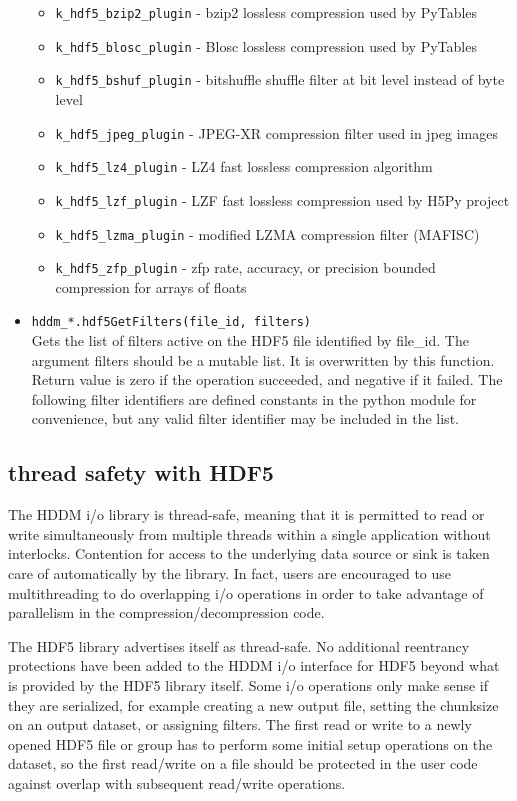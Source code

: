 \documentclass{revtex4}
\begin{document}
\begin{itemize}
\begin{itemize}
\item \texttt{k\_hdf5\_bzip2\_plugin} - bzip2 lossless compression used by PyTables
\item \texttt{k\_hdf5\_blosc\_plugin} - Blosc lossless compression used by PyTables
\item \texttt{k\_hdf5\_bshuf\_plugin} - bitshuffle shuffle filter at bit level instead of byte level
\item \texttt{k\_hdf5\_jpeg\_plugin} - JPEG-XR compression filter used in jpeg images
\item \texttt{k\_hdf5\_lz4\_plugin} - LZ4 fast lossless compression algorithm
\item \texttt{k\_hdf5\_lzf\_plugin} - LZF fast lossless compression used by H5Py project
\item \texttt{k\_hdf5\_lzma\_plugin} - modified LZMA compression filter (MAFISC)
\item \texttt{k\_hdf5\_zfp\_plugin} - zfp rate, accuracy, or precision bounded compression for arrays of floats
\end{itemize}
\item \texttt{hddm\_*.hdf5GetFilters(file\_id, filters)}\\
Gets the list of filters active on the HDF5 file identified by file\_id. The 
argument filters should be a mutable list. It is overwritten by this function.
Return value is zero if the operation succeeded, and negative if it failed.
The following filter identifiers are defined constants in the python module for
convenience, but any valid filter identifier may be included in the list.
\end{itemize}

\subsection{thread safety with HDF5}

The HDDM i/o library is thread-safe, meaning that it is permitted to read
or write simultaneously from multiple threads within a single application
without interlocks. Contention for access to the underlying data source or
sink is taken care of automatically by the library. In fact, users are
encouraged to use multithreading to do overlapping i/o operations in order
to take advantage of parallelism in the compression/decompression code.

The HDF5 library advertises itself as thread-safe. No additional reentrancy
protections have been added to the HDDM i/o interface for HDF5 beyond what is
provided by the HDF5 library itself. Some i/o operations only make sense if
they are serialized, for example creating a new output file, setting the
chunksize on an output dataset, or assigning filters. The first read or write
to a newly opened HDF5 file or group has to perform some initial setup
operations on the dataset, so the first read/write on a file should be
protected in the user code against overlap with subsequent read/write
operations.
\end{document}
